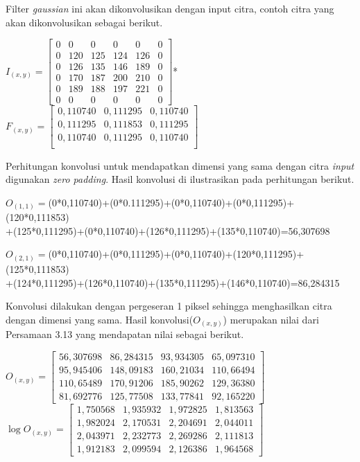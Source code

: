 \noindent Filter \emph{gaussian} ini akan dikonvolusikan dengan input citra, contoh citra yang akan dikonvolusikan sebagai berikut.

\noindent
$I_{(x,y)}=\left[
\begin{matrix}
0&0&0&0&0&0\\
0&120&	125&	124&	126&0\\
0&126&	135&	146&	189&0\\
0&170&	187&	200&	210&0\\
0&189&	188&	197&	221&0\\
0&0&0&0&0&0
\end{matrix}
\right]$*
$F_{(x,y)}=\left[
\begin{matrix}
0,110740 &0,111295&0,110740\\
0,111295&0,111853&0,111295\\
0,110740&0,111295&0,110740\\
\end{matrix}
\right]$

\noindent Perhitungan konvolusi untuk mendapatkan dimensi yang sama dengan citra \emph{input} digunakan \emph{zero padding}. Hasil konvolusi di ilustrasikan pada perhitungan berikut.

\noindent $O_{(1,1)}=$(0*0,110740)+(0*0.111295)+(0*0,110740)+(0*0,111295)+(120*0,111853)\\
+(125*0,111295)+(0*0,110740)+(126*0,111295)+(135*0,110740)=56,307698

\noindent$O_{(2,1)}=$(0*0,110740)+(0*0,111295)+(0*0,110740)+(120*0,111295)+(125*0,111853)\\
+(124*0,111295)+(126*0,110740)+(135*0,111295)+(146*0,110740)=86,284315

\noindent Konvolusi dilakukan dengan pergeseran 1 piksel sehingga menghasilkan citra dengan dimensi yang sama. Hasil konvolusi($O_{(x,y)}$) merupakan nilai dari Persamaan 3.13 yang mendapatan nilai sebagai berikut.

\noindent
$O_{(x,y)}=\left[
\begin{matrix}
56,307698&	86,284315&	93,934305&	65,097310\\
95,945406&	148,09183&	160,21034&	110,66494\\
110,65489&	170,91206&	185,90262&	129,36380\\
81,692776&	125,77508&	133,77841&	92,165220
\end{matrix}
\right]$\\
$\log O_{(x,y)}=\left[
\begin{matrix}
1,750568&	1,935932&	1,972825&	1,813563\\
1,982024&	2,170531&	2,204691&	2,044011\\
2,043971&	2,232773&	2,269286&	2,111813\\
1,912183&	2,099594&	2,126386&	1,964568

\end{matrix}
\right]$


